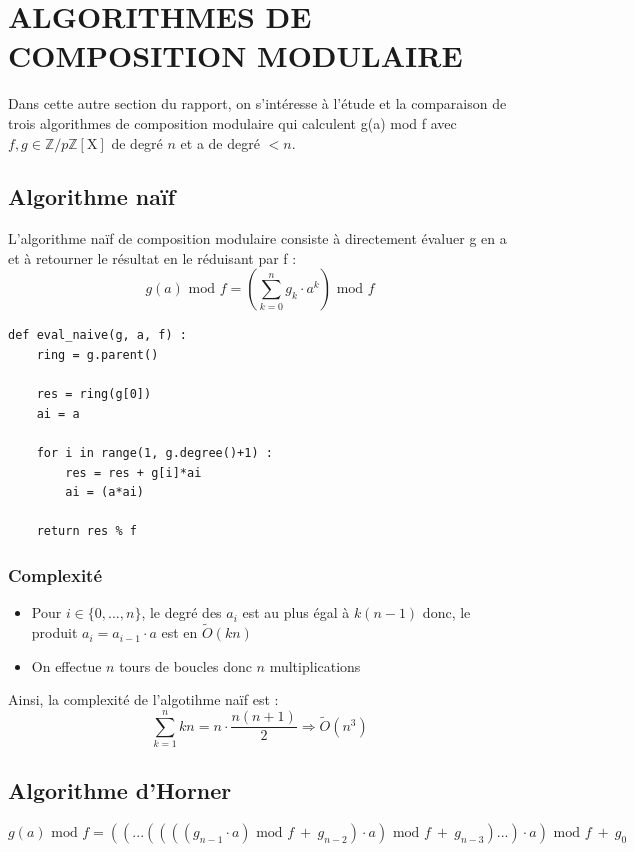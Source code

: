 \documentclass[a4paper]{article}
\begin{document}
\section{ALGORITHMES DE COMPOSITION MODULAIRE}

Dans cette autre section du rapport, on s'intéresse à l'étude et la comparaison de trois algorithmes de composition modulaire qui calculent g(a) mod f avec 
$f,g \in \mathbb{Z}/p\mathbb{Z}[\mathrm{X}]$ de degré $n$ et a de degré $< n$.



\subsection{Algorithme naïf}

L'algorithme naïf de composition modulaire consiste à directement évaluer g en a et à retourner le résultat en le réduisant par f :
\[
g(a)\text{ mod }f = \left(\sum_{k=0}^n g_k \cdot a^k\right) \text{ mod }f    
\]

\begin{lstlisting}[title={naive}]
def eval_naive(g, a, f) :
	ring = g.parent()

	res = ring(g[0])
	ai = a
	
    for i in range(1, g.degree()+1) :
		res = res + g[i]*ai
		ai = (a*ai)

	return res % f
\end{lstlisting}

\subsubsection*{Complexité}
\begin{itemize}
    \item Pour $i \in \{0,...,n\}$, le degré des $a_i$ est au plus égal à $k(n-1)$ donc, le produit $a_i=a_{i-1}\cdot a$ est en $\tilde{O}(kn)$
    \item On effectue $n$ tours de boucles donc $n$ multiplications
\end{itemize}
Ainsi, la complexité de l'algotihme naïf est :
\[
\sum_{k=1}^{n}kn=n \cdot \dfrac{n(n+1)}{2} \Longrightarrow \tilde{O}(n^3)
\]

\subsection{Algorithme d'Horner}

\[
g(a)\text{ mod }f = ((...((((g_{n-1}\cdot a)\text{ mod }f\ +\ g_{n-2})\cdot a)\text{ mod }f\ +\ g_{n-3})...)\cdot a)\text{ mod }f\ +\ g_0
\]
\end{document}
